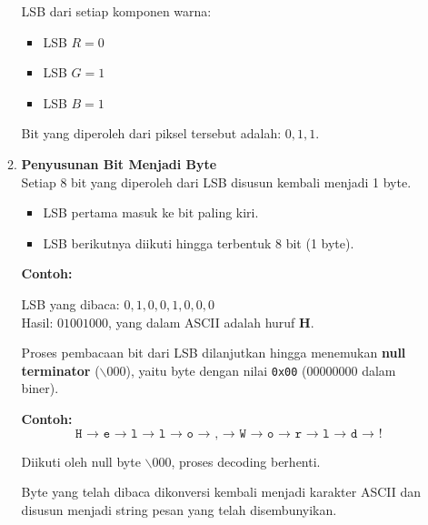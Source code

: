 \documentclass{ittelkom}
\begin{document}
\begin{enumerate}
\begin{enumerate}
                    \noindent
                    LSB dari setiap komponen warna:
                    \begin{itemize}
                        \item LSB $R = 0$
                        \item LSB $G = 1$
                        \item LSB $B = 1$
                    \end{itemize}

                    \noindent
                    Bit yang diperoleh dari piksel tersebut adalah: $0, 1, 1$.

              \item \textbf{Penyusunan Bit Menjadi Byte} \\
                    Setiap 8 bit yang diperoleh dari LSB disusun kembali menjadi 1 byte.
                    \begin{itemize}
                        \item LSB pertama masuk ke bit paling kiri.
                        \item LSB berikutnya diikuti hingga terbentuk 8 bit (1 byte).
                    \end{itemize}

                    \noindent
                    \textbf{Contoh:}
                    \begin{center}
                        LSB yang dibaca: $0, 1, 0, 0, 1, 0, 0, 0$ \\
                        Hasil: $01001000$, yang dalam ASCII adalah huruf \textbf{H}.
                    \end{center}

                    Proses pembacaan bit dari LSB dilanjutkan hingga menemukan \textbf{null
                        terminator} ($\backslash 000$), yaitu byte dengan nilai \texttt{0x00}
                    ($00000000$ dalam biner).

                    \noindent
                    \textbf{Contoh:}
                    \[
                        \texttt{H → e → l → l → o → , → W → o → r → l → d → !}
                    \]

                    Diikuti oleh null byte $\backslash 000$, proses decoding berhenti.

                    Byte yang telah dibaca dikonversi kembali menjadi karakter ASCII dan disusun
                    menjadi string pesan yang telah disembunyikan.


\end{enumerate}
\end{enumerate}
\end{document}
